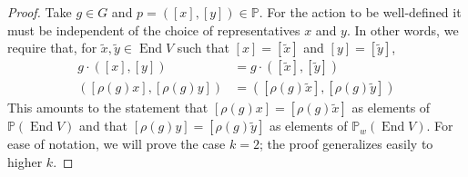 \documentclass{amsart}
\newcommand{\C}{\mathbb{C}}
\newcommand{\Proj}{\mathbb{P}}
\DeclareMathOperator{\End}{End}
\DeclareMathOperator{\SL}{SL}
\theoremstyle{definition}
\theoremstyle{remark}
\numberwithin{equation}{section}
\begin{document}
\begin{proof}
    Take $g\in G$ and $p=([x],[y])\in\Proj$.
    For the action to be well-defined it must be independent of the choice of representatives $x$ and $y$.
    In other words, we require that, for $\tilde x,\tilde y\in \End V$ such that $[x]=[\tilde x]$ and $[y]=[\tilde y]$,
    \begin{align}
        g\cdot ([x],[y])&=g\cdot ([\tilde x],[\tilde y]) \nonumber \\
        ([\rho(g)x],[\rho(g)y])&=([\rho(g)\tilde x],[\rho(g)\tilde y])
        \label{eq:welldef}
    \end{align}
    This amounts to the statement that $[\rho(g)x]=[\rho(g)\tilde x]$ as elements of $\Proj(\End V)$ and that $[\rho(g)y]=[\rho(g)\tilde y]$ as elements of $\Proj_w(\End V)$.
    For ease of notation, we will prove the case $k=2$; the proof generalizes easily to higher $k$. 


\end{proof}
\end{document}
